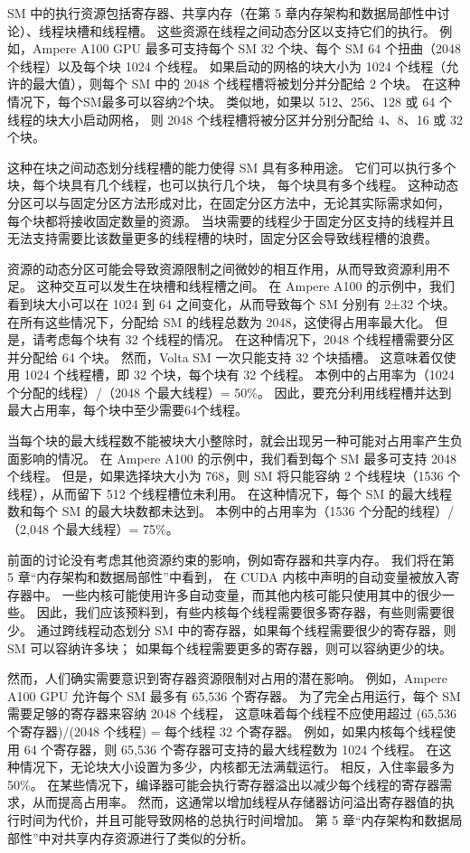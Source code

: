 SM 中的执行资源包括寄存器、共享内存（在第 5 章内存架构和数据局部性中讨论）、线程块槽和线程槽。 
这些资源在线程之间动态分区以支持它们的执行。 
例如，Ampere A100 GPU 最多可支持每个 SM 32 个块、每个 SM 64 个扭曲（2048 个线程）以及每个块 1024 个线程。 
如果启动的网格的块大小为 1024 个线程（允许的最大值），则每个 SM 中的 2048 个线程槽将被划分并分配给 2 个块。 
在这种情况下，每个SM最多可以容纳2个块。 类似地，如果以 512、256、128 或 64 个线程的块大小启动网格，
则 2048 个线程槽将被分区并分别分配给 4、8、16 或 32 个块。

这种在块之间动态划分线程槽的能力使得 SM 具有多种用途。 它们可以执行多个块，每个块具有几个线程，也可以执行几个块，
每个块具有多个线程。 这种动态分区可以与固定分区方法形成对比，在固定分区方法中，无论其实际需求如何，
每个块都将接收固定数量的资源。 当块需要的线程少于固定分区支持的线程并且无法支持需要比该数量更多的线程槽的块时，固定分区会导致线程槽的浪费。

资源的动态分区可能会导致资源限制之间微妙的相互作用，从而导致资源利用不足。 这种交互可以发生在块槽和线程槽之间。 
在 Ampere A100 的示例中，我们看到块大小可以在 1024 到 64 之间变化，从而导致每个 SM 分别有 2±32 个块。 
在所有这些情况下，分配给 SM 的线程总数为 2048，这使得占用率最大化。 但是，请考虑每个块有 32 个线程的情况。 
在这种情况下，2048 个线程槽需要分区并分配给 64 个块。 然而，Volta SM 一次只能支持 32 个块插槽。 
这意味着仅使用 1024 个线程槽，即 32 个块，每个块有 32 个线程。 
本例中的占用率为（1024 个分配的线程）/（2048 个最大线程）= 50\%。 
因此，要充分利用线程槽并达到最大占用率，每个块中至少需要64个线程。

当每个块的最大线程数不能被块大小整除时，就会出现另一种可能对占用率产生负面影响的情况。 
在 Ampere A100 的示例中，我们看到每个 SM 最多可支持 2048 个线程。 
但是，如果选择块大小为 768，则 SM 将只能容纳 2 个线程块（1536 个线程），从而留下 512 个线程槽位未利用。 
在这种情况下，每个 SM 的最大线程数和每个 SM 的最大块数都未达到。 
本例中的占用率为（1536 个分配的线程）/（2,048 个最大线程）= 75\%。

前面的讨论没有考虑其他资源约束的影响，例如寄存器和共享内存。 我们将在第 5 章“内存架构和数据局部性”中看到，
在 CUDA 内核中声明的自动变量被放入寄存器中。 一些内核可能使用许多自动变量，而其他内核可能只使用其中的很少一些。 
因此，我们应该预料到，有些内核每个线程需要很多寄存器，有些则需要很少。 
通过跨线程动态划分 SM 中的寄存器，如果每个线程需要很少的寄存器，则 SM 可以容纳许多块；
如果每个线程需要更多的寄存器，则可以容纳更少的块。

然而，人们确实需要意识到寄存器资源限制对占用的潜在影响。 例如，Ampere A100 GPU 允许每个 SM 最多有 65,536 个寄存器。 
为了完全占用运行，每个 SM 需要足够的寄存器来容纳 2048 个线程，
这意味着每个线程不应使用超过 (65,536 个寄存器)/(2048 个线程) = 每个线程 32 个寄存器。 
例如，如果内核每个线程使用 64 个寄存器，则 65,536 个寄存器可支持的最大线程数为 1024 个线程。 
在这种情况下，无论块大小设置为多少，内核都无法满载运行。 相反，入住率最多为50\%。 
在某些情况下，编译器可能会执行寄存器溢出以减少每个线程的寄存器需求，从而提高占用率。 
然而，这通常以增加线程从存储器访问溢出寄存器值的执行时间为代价，并且可能导致网格的总执行时间增加。 
第 5 章“内存架构和数据局部性”中对共享内存资源进行了类似的分析。

